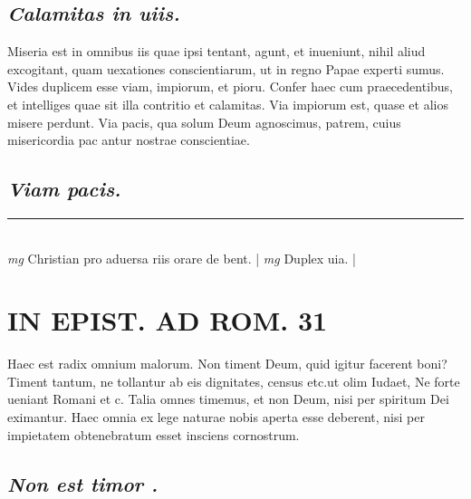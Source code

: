 \documentclass{article}
\begin{document}
\begin{pages}
\subsection*{\textit{Calamitas in uiis. }}\pstart Miseria est in omnibus iis quae ipsi tentant, agunt, et inueniunt, nihil aliud excogitant, quam uexationes conscientiarum, ut in regno Papae experti sumus.   \pend\pstart Vides duplicem esse viam, impiorum, et pioru.  Confer haec cum praecedentibus, et intelliges quae sit illa contritio et calamitas. Via impiorum est, quase et alios misere perdunt. Via pacis, qua solum Deum agnoscimus, patrem, cuius misericordia pac antur nostrae conscientiae.   \pend
{}
{}
\subsection*{\textit{Viam pacis. }}
\vspace{0.5cm}\noindent
\vspace{0.2cm}\rule{1cm}{0.2pt}\\ 
\hspace{0.2cm}\textit{mg}
\footnotesize Christian pro aduersa riis orare de bent.  
\normalsize| 
\hspace{0.2cm}\textit{mg}
\footnotesize Duplex uia.  
\normalsize| 
\section*{IN EPIST. AD ROM.  31 }
\marginpar{[ p.]}\pstart Haec est radix omnium malorum. Non timent Deum, quid igitur facerent boni? Timent tantum, ne tollantur ab eis dignitates, census etc.ut olim Iudaet, Ne forte ueniant Romani et c. Talia omnes timemus, et non Deum, nisi per spiritum Dei eximantur. Haec omnia ex lege naturae nobis aperta esse deberent, nisi per impietatem obtenebratum esset insciens cornostrum.   \pend
{}
{}
\subsection*{\textit{Non est timor . }}
{}

\end{pages}
\end{document}
